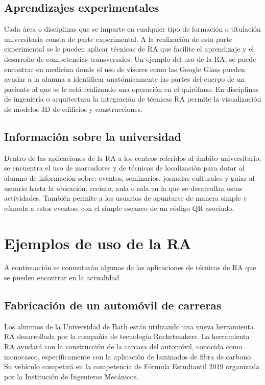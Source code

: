 \subsection{Aprendizajes experimentales} 

Cada área o disciplinas que se imparte en cualquier tipo de formación o titulación universitaria consta de parte experimental. A la realización de esta parte experimental se le pueden aplicar técnicas de RA que facilite el aprendizaje y el desarrollo de competencias transversales. Un ejemplo del uso de la RA, se puede encontrar en medicina donde el uso de visores como las Google Glass pueden ayudar a la alumna a identificar anatómicamente las partes del cuerpo de un paciente al que se le está realizando una operación en el quirófano. En disciplinas de ingeniería o arquitectura la integración de técnicas RA permite la visualización de modelos 3D de edificios y construcciones.

\subsection{Información sobre la universidad}  

Dentro de las aplicaciones de la RA a los centros referidos al ámbito universitario, se encuentra el uso de marcadores y de técnicas de localización para dotar al alumno de información sobre: eventos, seminarios, jornadas culturales y guiar al usuario hasta la ubicación, recinto, aula o sala en la que se desarrollan estas actividades. También permite a los usuarios de apuntarse de manera simple y cómoda a estos eventos, con el simple escaneo de un código QR asociado.

\section{Ejemplos de uso de la RA}

A continuación se comentarán algunas de las aplicaciones de técnicas de RA que se pueden encontrar en la actualidad.


\subsection{Fabricación de un automóvil de carreras} 

Los alumnos de la Universidad de Bath están utilizando una nueva herramienta RA desarrollada por la compañía de tecnología Rocketmakers. La herramienta RA ayudará con la construcción de la carcasa del automóvil, conocida como monocasco, específicamente con la aplicación de laminados de fibra de carbono. Su vehículo competirá en la competencia de Fórmula Estudiantil 2019 organizada por la Institución de Ingenieros Mecánicos.

